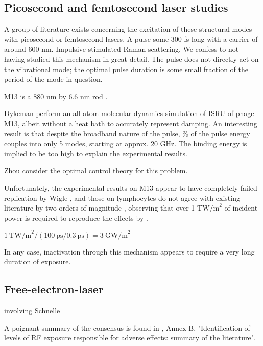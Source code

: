 \documentclass[paper.tex]{subfiles}
\begin{document}
\begin{multicols}{1}
\subsection{Picosecond and femtosecond laser studies}

A group of literature exists concerning the excitation of these structural modes with picosecond or femtosecond lasers. A pulse some 300 fs long with a carrier of around 600 nm. Impulsive stimulated Raman scattering. We confess to not having studied this mechanism in great detail. The pulse does not directly act on the vibrational mode; the optimal pulse duration is some small fraction of the period of the mode in question.

M13 is a 880 nm by 6.6 nm rod \cite{M132015}. 

Dykeman \cite{Vibrational2009} perform an all-atom molecular dynamics simulation of ISRU of phage M13, albeit without a heat bath to accurately represent damping. An interesting result is that despite the broadband nature of the pulse, \% of the pulse energy couples into only 5 modes, starting at approx. 20 GHz. The binding energy is implied to be too high to explain the experimental results. 

Zhou \cite{Maximum2010} consider the optimal control theory for this problem. 

Unfortunately, the experimental results on M13 appear to have completely failed replication by Wigle \cite{No2011}, and those on lymphocytes do not agree with existing literature by two orders of magnitude \cite{Targeted2002}, observing that over 1 T$\text{W/m}^2$ of incident power is required to reproduce the effects by . 

$1\ \text{TW/m}^2 / (100\ \text{ps} / 0.3\ \text{ps}) = 3\ \text{GW/m}^2$

In any case, inactivation through this mechanism appears to require a very long duration of exposure.




\subsection{Free-electron-laser }







involving Schnelle 



A poignant summary of the consensus is found in \cite{IEEE2006}, Annex B, "Identification of levels of RF exposure responsible for adverse effects: summary of the literature".


\end{multicols}
\end{document}
